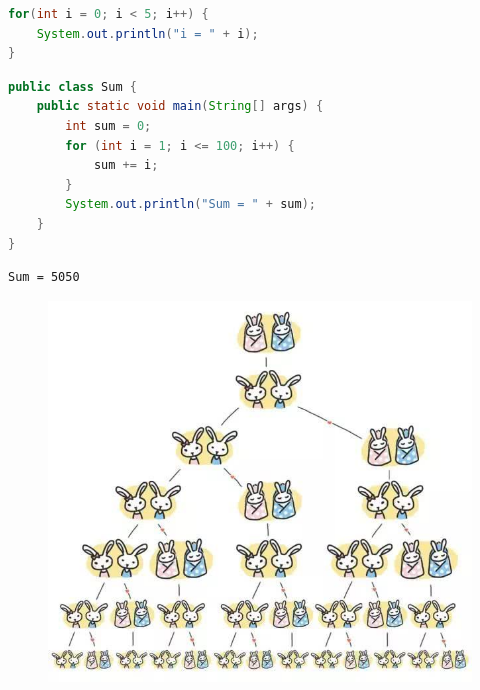 \begin{lstlisting}[language=Java]
for(int i = 0; i < 5; i++) {
    System.out.println("i = " + i);
}
\end{lstlisting}

\vspace{0.5cm}


\begin{lstlisting}[language=Java]
public class Sum {
    public static void main(String[] args) {
        int sum = 0;
        for (int i = 1; i <= 100; i++) {
            sum += i;
        }
        System.out.println("Sum = " + sum);
    }
} 
\end{lstlisting}

\begin{tcolorbox}
    \begin{verbatim}
Sum = 5050
\end{verbatim}
\end{tcolorbox}

\vspace{0.5cm}


\begin{figure}[H]
    \centering
    \includegraphics[scale=0.5]{img/Chapter3/3-2/1.png}
\end{figure}

